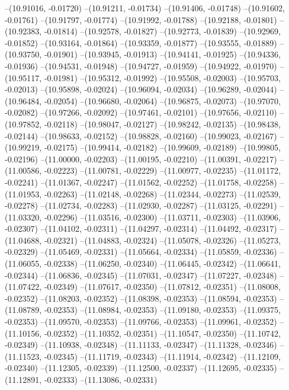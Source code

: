 --(10.91016, -0.01720)
--(10.91211, -0.01734)
--(10.91406, -0.01748)
--(10.91602, -0.01761)
--(10.91797, -0.01774)
--(10.91992, -0.01788)
--(10.92188, -0.01801)
--(10.92383, -0.01814)
--(10.92578, -0.01827)
--(10.92773, -0.01839)
--(10.92969, -0.01852)
--(10.93164, -0.01864)
--(10.93359, -0.01877)
--(10.93555, -0.01889)
--(10.93750, -0.01901)
--(10.93945, -0.01913)
--(10.94141, -0.01925)
--(10.94336, -0.01936)
--(10.94531, -0.01948)
--(10.94727, -0.01959)
--(10.94922, -0.01970)
--(10.95117, -0.01981)
--(10.95312, -0.01992)
--(10.95508, -0.02003)
--(10.95703, -0.02013)
--(10.95898, -0.02024)
--(10.96094, -0.02034)
--(10.96289, -0.02044)
--(10.96484, -0.02054)
--(10.96680, -0.02064)
--(10.96875, -0.02073)
--(10.97070, -0.02082)
--(10.97266, -0.02092)
--(10.97461, -0.02101)
--(10.97656, -0.02110)
--(10.97852, -0.02118)
--(10.98047, -0.02127)
--(10.98242, -0.02135)
--(10.98438, -0.02144)
--(10.98633, -0.02152)
--(10.98828, -0.02160)
--(10.99023, -0.02167)
--(10.99219, -0.02175)
--(10.99414, -0.02182)
--(10.99609, -0.02189)
--(10.99805, -0.02196)
--(11.00000, -0.02203)
--(11.00195, -0.02210)
--(11.00391, -0.02217)
--(11.00586, -0.02223)
--(11.00781, -0.02229)
--(11.00977, -0.02235)
--(11.01172, -0.02241)
--(11.01367, -0.02247)
--(11.01562, -0.02252)
--(11.01758, -0.02258)
--(11.01953, -0.02263)
--(11.02148, -0.02268)
--(11.02344, -0.02273)
--(11.02539, -0.02278)
--(11.02734, -0.02283)
--(11.02930, -0.02287)
--(11.03125, -0.02291)
--(11.03320, -0.02296)
--(11.03516, -0.02300)
--(11.03711, -0.02303)
--(11.03906, -0.02307)
--(11.04102, -0.02311)
--(11.04297, -0.02314)
--(11.04492, -0.02317)
--(11.04688, -0.02321)
--(11.04883, -0.02324)
--(11.05078, -0.02326)
--(11.05273, -0.02329)
--(11.05469, -0.02331)
--(11.05664, -0.02334)
--(11.05859, -0.02336)
--(11.06055, -0.02338)
--(11.06250, -0.02340)
--(11.06445, -0.02342)
--(11.06641, -0.02344)
--(11.06836, -0.02345)
--(11.07031, -0.02347)
--(11.07227, -0.02348)
--(11.07422, -0.02349)
--(11.07617, -0.02350)
--(11.07812, -0.02351)
--(11.08008, -0.02352)
--(11.08203, -0.02352)
--(11.08398, -0.02353)
--(11.08594, -0.02353)
--(11.08789, -0.02353)
--(11.08984, -0.02353)
--(11.09180, -0.02353)
--(11.09375, -0.02353)
--(11.09570, -0.02353)
--(11.09766, -0.02353)
--(11.09961, -0.02352)
--(11.10156, -0.02352)
--(11.10352, -0.02351)
--(11.10547, -0.02350)
--(11.10742, -0.02349)
--(11.10938, -0.02348)
--(11.11133, -0.02347)
--(11.11328, -0.02346)
--(11.11523, -0.02345)
--(11.11719, -0.02343)
--(11.11914, -0.02342)
--(11.12109, -0.02340)
--(11.12305, -0.02339)
--(11.12500, -0.02337)
--(11.12695, -0.02335)
--(11.12891, -0.02333)
--(11.13086, -0.02331)
